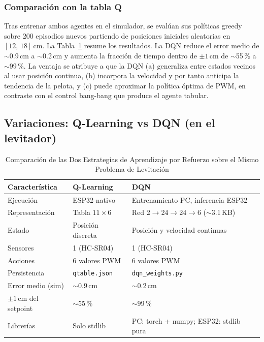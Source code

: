 \documentclass[conference]{IEEEtran}
\begin{document}
\subsubsection{Comparación con la tabla Q}

Tras entrenar ambos agentes en el simulador, se evalúan sus políticas greedy sobre 200 episodios nuevos partiendo de posiciones iniciales aleatorias en $[12,\,18]$\,cm. La Tabla~\ref{tab:rl-comparacion} resume los resultados. La DQN reduce el error medio de $\sim$0.9\,cm a $\sim$0.2\,cm y aumenta la fracción de tiempo dentro de $\pm1$\,cm de $\sim$55\,\% a $\sim$99\,\%. La ventaja se atribuye a que la DQN (a) generaliza entre estados vecinos al usar posición continua, (b) incorpora la velocidad y por tanto anticipa la tendencia de la pelota, y (c) puede aproximar la política óptima de PWM, en contraste con el control bang-bang que produce el agente tabular.

\subsection{Variaciones: Q-Learning vs DQN (en el levitador)}

\begin{table}[H]
\centering
\caption{Comparación de las Dos Estrategias de Aprendizaje por Refuerzo sobre el Mismo Problema de Levitación}
\label{tab:rl-comparacion}
\begin{tabular}{lll}
\toprule
\textbf{Característica} & \textbf{Q-Learning} & \textbf{DQN} \\
\midrule
Ejecución              & ESP32 nativo        & Entrenamiento PC, inferencia ESP32 \\
Representación         & Tabla $11\times6$   & Red 2$\to$24$\to$24$\to$6 ($\sim$3.1\,KB) \\
Estado                 & Posici\'on discreta & Posici\'on y velocidad continuas \\
Sensores               & 1 (HC-SR04)         & 1 (HC-SR04) \\
Acciones               & 6 valores PWM       & 6 valores PWM \\
Persistencia           & \texttt{qtable.json}& \texttt{dqn\_weights.py} \\
Error medio (sim)      & $\sim$0.9\,cm       & $\sim$0.2\,cm \\
$\pm1$\,cm del setpoint& $\sim$55\,\%        & $\sim$99\,\% \\
Librerías              & Solo stdlib         & PC: torch + numpy; ESP32: stdlib pura \\
\bottomrule
\end{tabular}
\end{table}
\end{document}
